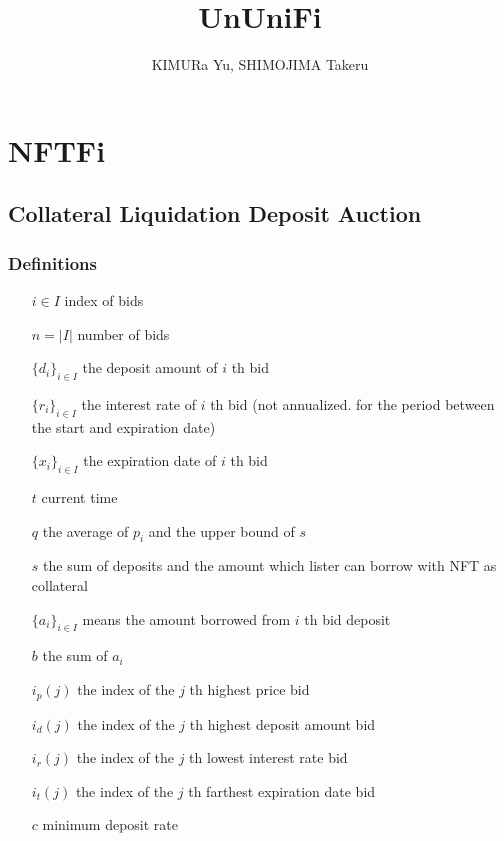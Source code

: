 \documentclass[dvipdfmx]{jsarticle}
\title{UnUniFi}
\author{KIMURa Yu, SHIMOJIMA Takeru}
\begin{document}

\maketitle

\section{NFTFi}

\subsection{Collateral Liquidation Deposit Auction}

\subsubsection{Definitions}

\begin{itemize}
  \item[$i \in I$] index of bids
  \item[$n = |I|$] number of bids
  \item[$\{d_i\}_{i \in I}$] the deposit amount of $i$ th bid
  \item[$\{r_i\}_{i \in I}$] the interest rate of $i$ th bid (not annualized. for the period between the start and expiration date)
  \item[$\{x_i\}_{i \in I}$] the expiration date of $i$ th bid
  \item[$t$] current time 
  \item[$q$] the average of $p_i$ and the upper bound of $s$
  \item[$s$] the sum of deposits and the amount which lister can borrow with NFT as collateral
  \item[$\{a_i\}_{i \in I}$] means the amount borrowed from $i$ th bid deposit
  \item[$b$] the sum of $a_i$
  \item[$i_p(j)$] the index of the $j$ th highest price bid
  \item[$i_d(j)$] the index of the $j$ th highest deposit amount bid
  \item[$i_r(j)$] the index of the $j$ th lowest interest rate bid
  \item[$i_t(j)$] the index of the $j$ th farthest expiration date bid
  \item[$c$] minimum deposit rate
\end{itemize}
\end{document}
